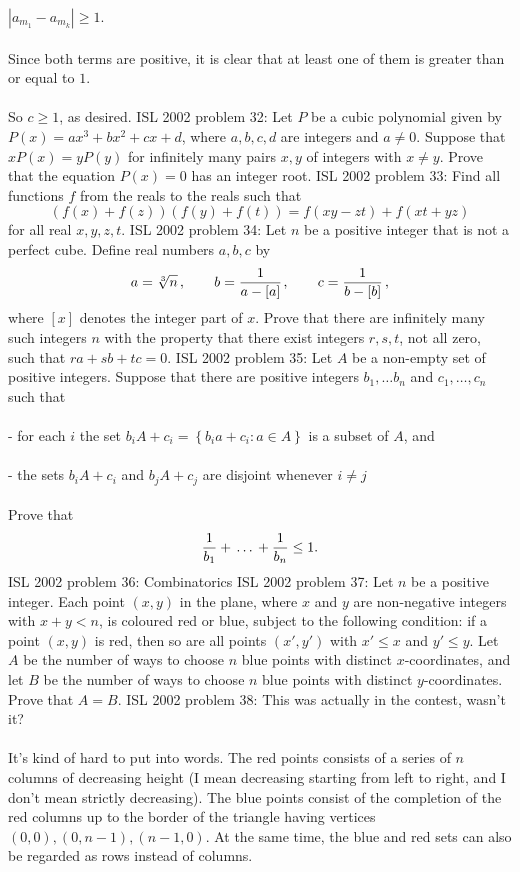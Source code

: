 $|a_{m_1}-a_{m_k}| \ge 1$. \\\\
Since both terms are positive, it is clear that at least one of them is greater than or equal to $1$. \\\\
So $c \ge 1$, as desired. 
ISL 2002 problem 32:  Let $P$ be a cubic polynomial given by $P(x)=ax^3+bx^2+cx+d$, where $a,b,c,d$ are integers and $a\ne0$. Suppose that $xP(x)=yP(y)$ for infinitely many pairs $x,y$ of integers with $x\ne y$. Prove that the equation $P(x)=0$ has an integer root. 
ISL 2002 problem 33:  Find all functions $f$ from the reals to the reals such that
\[ \left(f(x)+f(z)\right)\left(f(y)+f(t)\right)=f(xy-zt)+f(xt+yz) \]
for all real $x,y,z,t$. 
ISL 2002 problem 34:  Let $n$ be a positive integer that is not a perfect cube. Define real numbers $a,b,c$ by
\[ a=\root3\of n\kern1.5pt,\qquad b={1\over a-[a]}\kern1pt,\qquad c={1\over b-[b]}\kern1.5pt, \]
where $[x]$ denotes the integer part of $x$. Prove that there are infinitely many such integers $n$ with the property that there exist integers $r,s,t$, not all zero, such that $ra+sb+tc=0$. 
ISL 2002 problem 35:  Let $A$ be a non-empty set of positive integers. Suppose that there are positive integers $b_1,\ldots b_n$ and $c_1,\ldots,c_n$ such that \\\\
- for each $i$ the set $b_iA+c_i=\left\{b_ia+c_i\colon a\in A\right\}$ is a subset of $A$, and \\\\
- the sets $b_iA+c_i$ and $b_jA+c_j$ are disjoint whenever $i\ne j$ \\\\
Prove that
\[ {1\over b_1}+\,\ldots\,+{1\over b_n}\leq1. \] 
ISL 2002 problem 36:  Combinatorics 
ISL 2002 problem 37:  Let $n$ be a positive integer. Each point $(x,y)$ in the plane, where $x$ and $y$ are non-negative integers with $x+y<n$, is coloured red or blue, subject to the following condition: if a point $(x,y)$ is red, then so are all points $(x',y')$ with $x'\leq x$ and $y'\leq y$. Let $A$ be the number of ways to choose $n$ blue points with distinct $x$-coordinates, and let $B$ be the number of ways to choose $n$ blue points with distinct $y$-coordinates. Prove that $A=B$. 
ISL 2002 problem 38:  This was actually in the contest, wasn't it? \\\\
It's kind of hard to put into words. The red points consists of a series of $n$ columns of decreasing height (I mean decreasing starting from left to right, and I don't mean strictly decreasing). The blue points consist of the completion of the red columns up to the border of the triangle having vertices $(0,0),(0,n-1),(n-1,0)$. At the same time, the blue and red sets can also be regarded as rows instead of columns. \\\\
